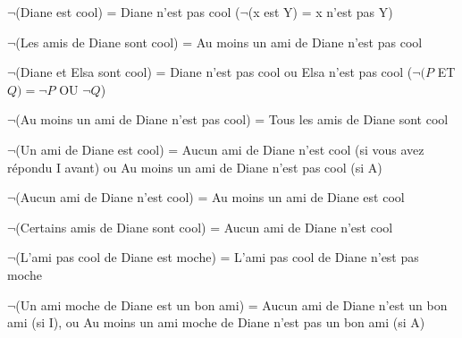 \begin{frame}

$\neg$(Diane est cool) = \pause Diane n'est pas cool \pause ($\neg$(x est Y) = x n'est pas Y)\pause\newline

$\neg$(Les amis de Diane sont cool) = \pause Au moins un ami de Diane n'est pas cool\pause\newline

$\neg$(Diane et Elsa sont cool) = \pause Diane n'est pas cool ou Elsa n'est pas cool \pause ($\neg (P $ ET $ Q) = \neg P $ OU $ \neg Q$)\pause\newline

$\neg$(Au moins un ami de Diane n'est pas cool) = \pause Tous les amis de Diane sont cool

\end{frame}

\begin{frame}
	
	
$\neg$(Un ami de Diane est cool) = \pause Aucun ami de Diane n'est cool (si vous avez répondu I avant) ou Au moins un ami de Diane n'est pas cool (si A)\pause\newline


$\neg$(Aucun ami de Diane n'est cool) = \pause Au moins un ami de Diane est cool\pause\newline

$\neg$(Certains amis de Diane sont cool) = \pause Aucun ami de Diane n'est cool

\end{frame}
\begin{frame}
	
	
$\neg$(L'ami pas cool de Diane est moche) = \pause L'ami pas cool de Diane n'est pas moche\pause\newline

$\neg$(Un ami moche de Diane est un bon ami) = \pause Aucun ami de Diane n'est un bon ami (si I), ou Au moins un ami moche de Diane n'est pas un bon ami (si A)

\end{frame}





